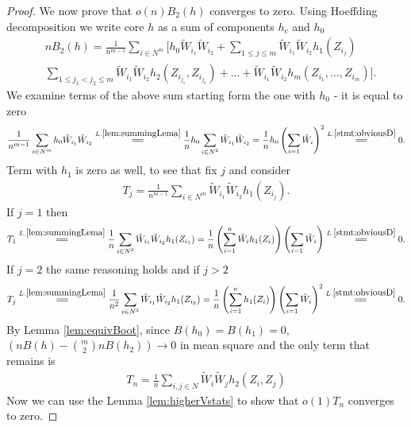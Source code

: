 \documentclass{article} %
\begin{document}
\begin{proof}
We now prove that $o(n) B_2(h)$ converges to zero. Using Hoeffding decomposition  we write core  $h$ as a sum of components $h_c$ and $h_0$  
\begin{align}
\label{eq:bootstrapedOne}
 &n B_2(h) = \frac{1} {n^{m-1}}  \sum_{i \in N^m}  \Big[h_0  \tilde W_{i_1} \tilde W_{i_2} + \sum_{1 \leq j \leq m } \tilde W_{i_1} \tilde W_{i_2} h_1(Z_{i_j})    \\ 
 &\sum_{1 \leq j_1 < j_2 \leq m } \tilde W_{i_1} \tilde W_{i_2} h_2(Z_{i_{j_1}},Z_{i_{j_2}}) + ... +  \tilde W_{i_1} \tilde W_{i_2}   h_m(Z_{i_1},...,Z_{i_m}) \Big].
\end{align}
We examine terms of the above sum starting form the one with $h_0$ - it is equal to zero
\begin{align*}
\frac{1} {n^{m-1}}  \sum_{i \in N^m}  h_0  \tilde W_{i_1} \tilde W_{i_2}   \overset{L.\ref{lem:summingLema}}{=\joinrel=} \frac 1 n h_0 \sum_{i \in N^2} \tilde W_{i_1} \tilde W_{i_2} = \frac 1 n h_0 \left( \sum_{i=1} \tilde W_i \right)^2  \overset{L.\ref{stmt:obviousD}}{=\joinrel=} 0.
\end{align*}  
Term with $h_1$ is zero as well, to see that fix $j$ and consider 
\begin{align*}
T_{j} = \frac{1} {n^{m-1}}  \sum_{i \in N^m}  \tilde W_{i_1} \tilde W_{i_2} h_1(Z_{i_j}).  
\end{align*}  
If $j=1$ then
\begin{align*}
T_{1} \overset{L.\ref{lem:summingLema}}{=\joinrel=} \frac{1} {n}  \sum_{i \in N^2}  \tilde W_{i_1} \tilde W_{i_2} h_1(Z_{i_1}) =  \frac{1} {n}  \left( \sum_{i=1}^n  \tilde W_i h_1(Z_i) \right) \left( \sum_{i=1} \tilde W_i \right) \overset{L.\ref{stmt:obviousD}}{=\joinrel=} 0.
\end{align*}
If $j=2$ the same reasoning holds and if $j>2$
\begin{align*}
T_{j} \overset{L.\ref{lem:summingLema}}{=\joinrel=} \frac{1} {n^2}  \sum_{i \in N^3}  \tilde W_{i_1} \tilde W_{i_2} h_1(Z_{i_3}) =  \frac{1} {n}  \left( \sum_{i=1}^n h_1(Z_i) \right) \left( \sum_{i=1} \tilde W_i \right)^2 \overset{L.\ref{stmt:obviousD}}{=\joinrel=} 0.
\end{align*}
By Lemma \ref{lem:equivBoot}, since $B(h_0)=B(h_1)=0$, $(nB(h) - \binom m 2 nB(h_2)) \to 0$ in mean square and the only term that remains is 
\begin{align*}
T_n = \frac{1} {n}  \sum_{i,j \in N}  \tilde W_{i} \tilde W_j h_2(Z_i,Z_j)
\end{align*}
 Now we can use the Lemma \ref{lem:higherVstats} to show that $o(1) T_n$ converges to zero. 
 \end{proof}
\end{document}
